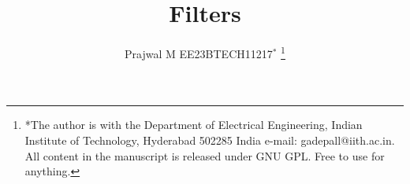 \documentclass[journal,12pt,twocolumn]{IEEEtran}
\begin{document}

\def\putbox#1#2#3{\makebox[0in][l]{\makebox[#1][l]{}\raisebox{\baselineskip}[0in][0in]{\raisebox{#2}[0in][0in]{#3}}}}
\def\rightbox#1{\makebox[0in][r]{#1}}
\def\centbox#1{\makebox[0in]{#1}}
\def\topbox#1{\raisebox{-\baselineskip}[0in][0in]{#1}}
\def\midbox#1{\raisebox{-0.5\baselineskip}[0in][0in]{#1}}

\vspace{3cm}

\title{
	Filters
}


%
%
%

\author{Prajwal M EE23BTECH11217$^{*}$ %
	\thanks{*The author is with the Department
		of Electrical Engineering, Indian Institute of Technology, Hyderabad
		502285 India e-mail:  gadepall@iith.ac.in.  All content in the manuscript is
		released under GNU GPL.  Free to use for anything. }%
}
% 
%
\end{document}
